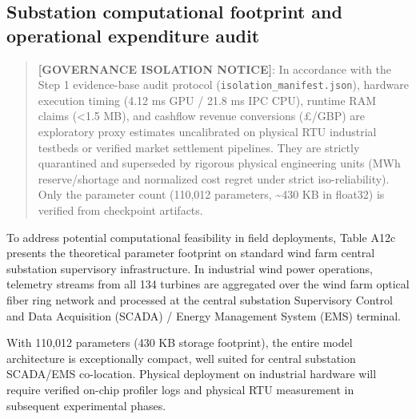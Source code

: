 \documentclass[
  journal]{IEEEtran}
\begin{document}
\FloatBarrier

\subsection*{Substation computational footprint and operational
expenditure
audit}\label{substation-computational-footprint-and-operational-expenditure-audit}

\begin{quote}
\textbf{{[}GOVERNANCE ISOLATION NOTICE{]}}: In accordance with the Step
1 evidence-base audit protocol (\texttt{isolation\_manifest.json}),
hardware execution timing (4.12 ms GPU / 21.8 ms IPC CPU), runtime RAM
claims (\textless1.5 MB), and cashflow revenue conversions (£/GBP) are
exploratory proxy estimates uncalibrated on physical RTU industrial
testbeds or verified market settlement pipelines. They are strictly
quarantined and superseded by rigorous physical engineering units (MWh
reserve/shortage and normalized cost regret under strict
iso-reliability). Only the parameter count (110,012 parameters,
\textasciitilde430 KB in float32) is verified from checkpoint artifacts.
\end{quote}

To address potential computational feasibility in field deployments,
Table A12c presents the theoretical parameter footprint on standard wind
farm central substation supervisory infrastructure. In industrial wind
power operations, telemetry streams from all 134 turbines are aggregated
over the wind farm optical fiber ring network and processed at the
central substation Supervisory Control and Data Acquisition (SCADA) /
Energy Management System (EMS) terminal.

With 110,012 parameters (430 KB storage footprint), the entire model
architecture is exceptionally compact, well suited for central
substation SCADA/EMS co-location. Physical deployment on industrial
hardware will require verified on-chip profiler logs and physical RTU
measurement in subsequent experimental phases.
\end{document}
